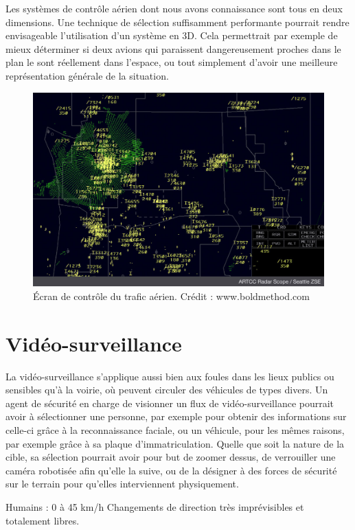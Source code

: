 	Les systèmes de contrôle aérien dont nous avons connaissance sont tous en deux dimensions. Une technique de sélection suffisamment performante pourrait rendre envisageable l'utilisation d'un système en 3D. Cela permettrait par exemple de mieux déterminer si deux avions qui paraissent dangereusement proches dans le plan le sont réellement dans l'espace, ou tout simplement d'avoir une meilleure représentation générale de la situation.
    
	\begin{figure}[ht]
		\centering
		\includegraphics[width=\textwidth]{figures/Radar-Scope-ZSE}
		\caption{Écran de contrôle du trafic aérien. Crédit : www.boldmethod.com}
		\label{fig:airtraffic}
	\end{figure}
	
	\section{Vidéo-surveillance}
	La vidéo-surveillance s'applique aussi bien aux foules dans les lieux publics ou sensibles qu'à la voirie, où peuvent circuler des véhicules de types divers. Un agent de sécurité en charge de visionner un flux de vidéo-surveillance pourrait avoir à sélectionner une personne, par exemple pour obtenir des informations sur celle-ci grâce à la reconnaissance faciale, ou un véhicule, pour les mêmes raisons, par exemple grâce à sa plaque d'immatriculation. Quelle que soit la nature de la cible, sa sélection pourrait avoir pour but de zoomer dessus, de verrouiller une caméra robotisée afin qu'elle la suive, ou de la désigner à des forces de sécurité sur le terrain pour qu'elles interviennent physiquement.
	
	Humains : 0 à 45 km/h
	Changements de direction très imprévisibles et totalement libres.
	
